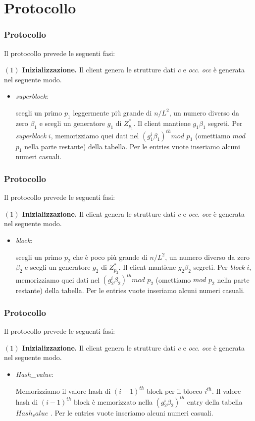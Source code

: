 \documentclass{beamer}
\begin{document}
\section{Protocollo}
\begin{frame}
\frametitle{Protocollo}
Il protocollo prevede le seguenti fasi:

\textbf{$(1)$ Inizializzazione.} Il client genera le strutture dati \textit{c} e \textit{occ}. \textit{occ} è generata nel seguente modo.

\begin{itemize}
	\item \textit{superblock}:
	
	scegli un primo $ p_{1} $ leggermente più grande
	di $n/L^{2}$, un numero diverso da zero $ \beta_{1} $ e scegli un generatore
	$g_{1}$ di $ Z^{*}_{p_{1}} $. Il client mantiene $ g_{1} \beta_{1} $ segreti. Per \textit{superblock} $ i $, memorizziamo quei dati nel $ (g^{i}_{1}\beta_{1})^{th} mod$ $p_{1}$
	(omettiamo $mod$ $ p_{1}$ nella parte restante) della tabella.
	Per le entries vuote inseriamo alcuni numeri casuali.
\end{itemize}
\end{frame}
\begin{frame}
\frametitle{Protocollo}
Il protocollo prevede le seguenti fasi:

\textbf{$(1)$ Inizializzazione.} Il client genera le strutture dati \textit{c} e \textit{occ}. \textit{occ} è generata nel seguente modo.

\begin{itemize}
\item \textit{block}:

scegli un primo $ p_{2} $ che è poco più grande di $n/L^{2}$,
un numero diverso da zero $ \beta_{2} $ e scegli un generatore $g_{2}$ di $ Z^{*}_{p_{2}} $.
Il client mantiene $ g_{2} \beta_{2} $ segreti. Per \textit{block} $ i $, memorizziamo quei dati nel $ (g^{i}_{2}\beta_{2})^{th} mod$ $p_{2}$
(omettiamo $mod$ $ p_{2}$ nella parte restante) della tabella.
Per le entries vuote inseriamo alcuni numeri casuali.
\end{itemize}
\end{frame}
\begin{frame}
\frametitle{Protocollo}
Il protocollo prevede le seguenti fasi:

\textbf{$(1)$ Inizializzazione.} Il client genera le strutture dati \textit{c} e \textit{occ}. \textit{occ} è generata nel seguente modo.

\begin{itemize}
\item \textit{Hash\_value}:

Memorizziamo il valore hash di $ (i-1)^{th} $ block
per il blocco $ i^{th} $. Il valore hash di $ (i-1)^{th} $ block
è memorizzato nella $ (g^{i}_{2}\beta_{2})^{th}$ entry della tabella $Hash_value$ .
Per le entries vuote inseriamo alcuni numeri casuali.
\end{itemize}
\end{frame}
\end{document}
